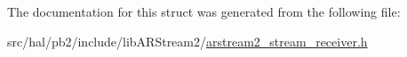 The documentation for this struct was generated from the following file\+:\begin{DoxyCompactItemize}
\item 
src/hal/pb2/include/lib\+A\+R\+Stream2/\hyperlink{arstream2__stream__receiver_8h}{arstream2\+\_\+stream\+\_\+receiver.\+h}\end{DoxyCompactItemize}
